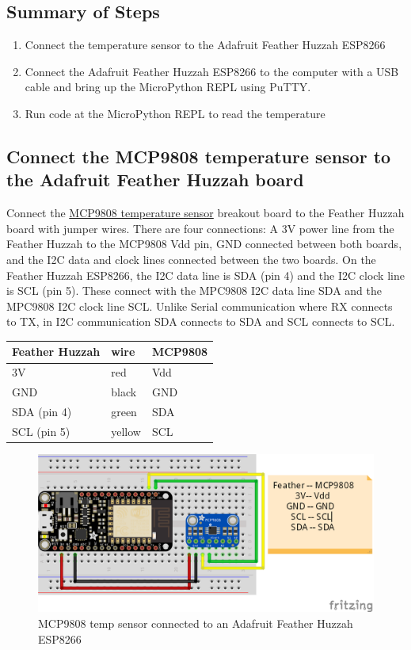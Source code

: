 \documentclass{book}
\makeatletter
\def\maxwidth{\ifdim\Gin@nat@width>\linewidth\linewidth
    \else\Gin@nat@width\fi}
\let\Oldincludegraphics\includegraphics
\renewcommand{\includegraphics}[1]{\Oldincludegraphics[width=.8\maxwidth]{#1}}
\providecommand{\tightlist}{%
      \setlength{\itemsep}{0pt}\setlength{\parskip}{0pt}}
\makeatother
\begin{document}
    \subsection{Summary of Steps}\label{summary-of-steps}

    \begin{enumerate}
\def\labelenumi{\arabic{enumi}.}
\tightlist
\item
  Connect the temperature sensor to the Adafruit Feather Huzzah ESP8266
\item
  Connect the Adafruit Feather Huzzah ESP8266 to the computer with a USB
  cable and bring up the MicroPython REPL using PuTTY.
\item
  Run code at the MicroPython REPL to read the temperature
\end{enumerate}

    \subsection{Connect the MCP9808 temperature sensor to the Adafruit
Feather Huzzah
board}\label{connect-the-mcp9808-temperature-sensor-to-the-adafruit-feather-huzzah-board}

    Connect the \href{https://www.adafruit.com/product/1782}{MCP9808
temperature sensor} breakout board to the Feather Huzzah board with
jumper wires. There are four connections: A 3V power line from the
Feather Huzzah to the MCP9808 Vdd pin, GND connected between both
boards, and the I2C data and clock lines connected between the two
boards. On the Feather Huzzah ESP8266, the I2C data line is SDA (pin 4)
and the I2C clock line is SCL (pin 5). These connect with the MPC9808
I2C data line SDA and the MPC9808 I2C clock line SCL. Unlike Serial
communication where RX connects to TX, in I2C communication SDA connects
to SDA and SCL connects to SCL.

\begin{longtable}[]{@{}lll@{}}
\toprule
Feather Huzzah & wire & MCP9808\tabularnewline
\midrule
\endhead
3V & red & Vdd\tabularnewline
GND & black & GND\tabularnewline
SDA (pin 4) & green & SDA\tabularnewline
SCL (pin 5) & yellow & SCL\tabularnewline
\bottomrule
\end{longtable}

\begin{figure}
\centering
\includegraphics{images/feather_huzzah_temp_sensor_fritzing.png}
\caption{MCP9808 temp sensor connected to an Adafruit Feather Huzzah
ESP8266}
\end{figure}
\end{document}
